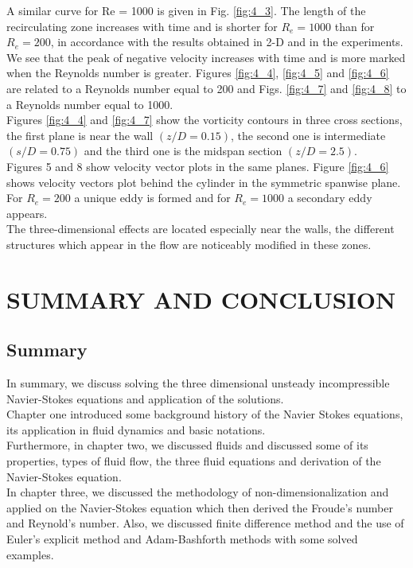 \documentclass[11pt]{report}
\begin{document}
	A similar curve for Re = 1000 is given in Fig. \ref{fig:4_3}. The length of the recirculating zone increases with time and is shorter for $R_e = 1000$ than for $R_e = 200$, in accordance with the results obtained in 2-D and in the experiments. We see that the peak of negative velocity increases with time and is more marked when the Reynolds number is greater.
	Figures \ref{fig:4_4}, \ref{fig:4_5} and \ref{fig:4_6} are related to a Reynolds number equal to 200 and Figs. \ref{fig:4_7} and \ref{fig:4_8} to a Reynolds number equal to 1000. 
	\\Figures \ref{fig:4_4} and \ref{fig:4_7} show the vorticity contours in three cross sections, the first plane is near the wall $(z/D = 0.15)$, the second one is intermediate $(s/D = 0.75)$ and the third one is the midspan section $(z/D = 2.5)$. \\
	Figures 5 and 8 show velocity vector plots in the same planes. Figure \ref{fig:4_6} shows velocity vectors plot behind the cylinder in the symmetric spanwise plane. For $R_e = 200$ a unique eddy is formed and for $R_e = 1000$ a secondary eddy appears.\\
	The three-dimensional effects are located especially near the walls, the different structures which appear in the flow are noticeably modified in these zones.
	
	
	\chapter{SUMMARY AND CONCLUSION}
	\section{Summary}
	In summary, we discuss solving the three dimensional unsteady incompressible Navier-Stokes equations and application of the solutions.\\
	
	Chapter one introduced some background history of the Navier Stokes equations, its application in fluid dynamics and basic notations.\\
	
	Furthermore, in chapter two, we discussed fluids and discussed some of its properties, types of fluid flow, the three fluid equations and derivation of the Navier-Stokes equation.\\
	
	In chapter three, we discussed the methodology of non-dimensionalization and applied on the Navier-Stokes equation which then derived the Froude's number and Reynold's number. Also, we discussed finite difference method and the use of Euler's explicit method and Adam-Bashforth methods with some solved examples.\\
	
\end{document}
